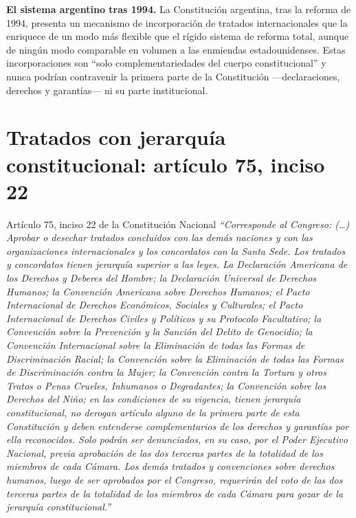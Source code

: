 \documentclass[12pt,oneside]{book}
\begin{document}
\begin{important}
\textbf{El sistema argentino tras 1994.} La Constitución argentina, tras la reforma de 1994, presenta un mecanismo de incorporación de tratados internacionales que la enriquece de un modo más flexible que el rígido sistema de reforma total, aunque de ningún modo comparable en volumen a las enmiendas estadounidenses. Estas incorporaciones son ``solo complementariedades del cuerpo constitucional'' y nunca podrían contravenir la primera parte de la Constitución ---declaraciones, derechos y garantías--- ni su parte institucional.
\end{important}

\section{Tratados con jerarquía constitucional: artículo 75, inciso 22}

\begin{norma}{Artículo 75, inciso 22 de la Constitución Nacional}
\textit{``Corresponde al Congreso: (\ldots) Aprobar o desechar tratados concluidos con las demás naciones y con las organizaciones internacionales y los concordatos con la Santa Sede. Los tratados y concordatos tienen jerarquía superior a las leyes. La Declaración Americana de los Derechos y Deberes del Hombre; la Declaración Universal de Derechos Humanos; la Convención Americana sobre Derechos Humanos; el Pacto Internacional de Derechos Económicos, Sociales y Culturales; el Pacto Internacional de Derechos Civiles y Políticos y su Protocolo Facultativo; la Convención sobre la Prevención y la Sanción del Delito de Genocidio; la Convención Internacional sobre la Eliminación de todas las Formas de Discriminación Racial; la Convención sobre la Eliminación de todas las Formas de Discriminación contra la Mujer; la Convención contra la Tortura y otros Tratos o Penas Crueles, Inhumanos o Degradantes; la Convención sobre los Derechos del Niño; en las condiciones de su vigencia, tienen jerarquía constitucional, no derogan artículo alguno de la primera parte de esta Constitución y deben entenderse complementarios de los derechos y garantías por ella reconocidos. Solo podrán ser denunciados, en su caso, por el Poder Ejecutivo Nacional, previa aprobación de las dos terceras partes de la totalidad de los miembros de cada Cámara. Los demás tratados y convenciones sobre derechos humanos, luego de ser aprobados por el Congreso, requerirán del voto de las dos terceras partes de la totalidad de los miembros de cada Cámara para gozar de la jerarquía constitucional.''}
\end{norma}
\end{document}
